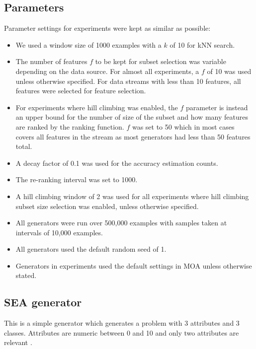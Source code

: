 \subsection*{Parameters}
Parameter settings for experiments were kept as similar as possible:
\begin{itemize}
\item
We used a window size of 1000 examples with a $k$ of 10 for kNN search.

\item
The number of features $f$ to be kept for subset selection was variable depending on the data source. For almost all experiments, a $f$ of 10 was used unless otherwise specified. For data streams with less than 10 features, all features were selected for feature selection. 

\item For experiments where hill climbing was enabled, the $f$ parameter is instead an upper bound for the number of size of the subset and how many features are ranked by the ranking function. $f$ was set to 50 which in most cases covers all features in the stream as most generators had less than 50 features total.

\item A decay factor of 0.1 was used for the accuracy estimation counts.

\item The re-ranking interval was set to 1000.

\item A hill climbing window of 2 was used for all experiments where hill climbing subset size selection was enabled, unless otherwise specified.

\item All generators were run over 500,000 examples with samples taken at intervals of 10,000 examples.

\item All generators used the default random seed of 1.

\item Generators in experiments used the default settings in MOA unless otherwise stated.
\end{itemize}

\subsection{SEA generator}
This is a simple generator which generates a problem with 3 attributes and 3 classes. Attributes are numeric between 0 and 10 and only two attributes are relevant \citep{SEA}.

